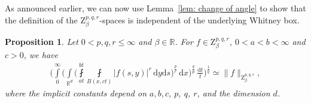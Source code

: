 \documentclass[11pt, leqno,parskip=half]{amsart}
\newtheorem{proposition}[theorem]{Proposition}
\theoremstyle{definition}
\newcommand{\IR}{\mathbb{R}}
\newcommand{\Z}{\mathrm{Z}}
\renewcommand{\d}{\mathrm{d}}
\numberwithin{equation}{section}
\begin{document}
As announced earlier, we can now use Lemma~\ref{lem: change of angle} to show that the definition of the $\Z^{p,q,r}_\beta$-spaces is independent of the underlying Whitney box.

\begin{proposition}
\label{prop: independent Whitney cube}
    Let $0<p,q,r\leq \infty$ and $\beta\in\IR$. For $f\in \Z^{p,q,r}_\beta$, $0<a<b<\infty$ and $c>0$, we have
    \begin{align*}
        \bigg(\int\limits_0^\infty\bigg( \int\limits_{\IR^d}\bigg(  \fint\limits_{at}^{bt} \fint\limits_{B(x, ct)} |f(s,y)|^r \, \d y \d s\bigg)^\frac{p}{r}\,\d x \bigg)^\frac{q}{p}\,\frac{\d t}{t}\bigg)^\frac{1}{q}\simeq \|f\|_{\Z^{p,q,r}_\beta},
    \end{align*}
    where the implicit constants depend on $a,b,c$, $p$, $q$, $r$, and the dimension $d$.
\end{proposition}
\end{document}
